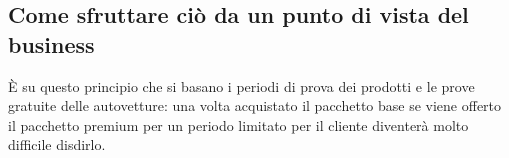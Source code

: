 \subsection{Come sfruttare ciò da un punto di vista del business}
È su questo principio che si basano i periodi di prova dei prodotti e le prove
gratuite delle autovetture: una volta acquistato il pacchetto base se viene
offerto il pacchetto premium per un periodo limitato per il cliente diventerà
molto difficile disdirlo.
